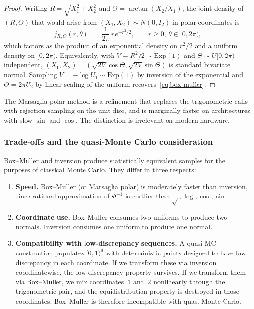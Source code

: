 \documentclass[11pt,a4paper]{article}
\theoremstyle{plain}
\theoremstyle{definition}
\theoremstyle{remark}
\begin{document}
\begin{proof}
Writing $R = \sqrt{X_1^2 + X_2^2}$ and $\Theta = \arctan(X_2/X_1)$,
the joint density of $(R, \Theta)$ that would arise from
$(X_1, X_2) \sim N(0, I_2)$ in polar coordinates is
\[
f_{R,\Theta}(r, \theta) \;=\;
\frac{1}{2\pi}\, r\, e^{-r^2/2},
\qquad r \geq 0,\ \theta \in [0, 2\pi),
\]
which factors as the product of an exponential density on $r^2/2$ and a
uniform density on $[0, 2\pi)$. Equivalently, with $V = R^2/2 \sim
\mathrm{Exp}(1)$ and $\Theta \sim U[0, 2\pi)$ independent,
$(X_1, X_2) = (\sqrt{2V}\cos\Theta, \sqrt{2V}\sin\Theta)$ is standard
bivariate normal. Sampling $V = -\log U_1 \sim \mathrm{Exp}(1)$ by
inversion of the exponential and $\Theta = 2\pi U_2$ by linear scaling
of the uniform recovers~\eqref{eq:box-muller}.
\end{proof}

The Marsaglia polar method is a refinement that replaces the
trigonometric calls with rejection sampling on the unit disc, and is
marginally faster on architectures with slow $\sin$ and $\cos$. The
distinction is irrelevant on modern hardware.

\subsubsection{Trade-offs and the quasi-Monte Carlo consideration}

Box--Muller and inversion produce statistically equivalent samples for
the purposes of classical Monte Carlo. They differ in three respects:
\begin{enumerate}
\item \textbf{Speed.} Box--Muller (or Marsaglia polar) is moderately
faster than inversion, since rational approximation of $\Phi^{-1}$ is
costlier than $\sqrt{}, \log, \cos, \sin$.
\item \textbf{Coordinate use.} Box--Muller consumes two uniforms to
produce two normals. Inversion consumes one uniform to produce one
normal.
\item \textbf{Compatibility with low-discrepancy sequences.} A quasi-MC
construction populates $[0,1)^d$ with deterministic points designed to
have low discrepancy in each coordinate. If we transform these via
inversion coordinatewise, the low-discrepancy property survives. If we
transform them via Box--Muller, we mix coordinates~$1$ and~$2$
nonlinearly through the trigonometric pair, and the equidistribution
property is destroyed in those coordinates. Box--Muller is therefore
incompatible with quasi-Monte Carlo.
\end{enumerate}
\end{document}
